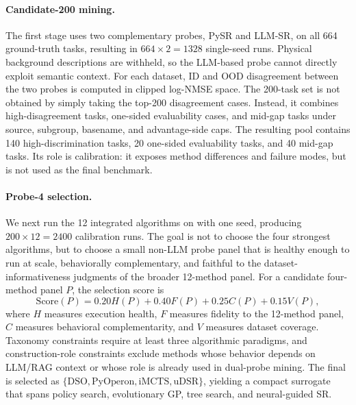 \paragraph{Candidate-200 mining.}
The first stage uses two complementary probes, PySR and LLM-SR, on all 664 ground-truth tasks, resulting in $664 \times 2 = 1328$ single-seed runs. Physical background descriptions are withheld, so the LLM-based probe cannot directly exploit semantic context. For each dataset, ID and OOD disagreement between the two probes is computed in clipped log-NMSE space. The 200-task \candidate{} set is not obtained by simply taking the top-200 disagreement cases. Instead, it combines high-disagreement tasks, one-sided evaluability cases, and mid-gap tasks under source, subgroup, basename, and advantage-side caps. The resulting pool contains 140 high-discrimination tasks, 20 one-sided evaluability tasks, and 40 mid-gap tasks. Its role is calibration: it exposes method differences and failure modes, but is not used as the final benchmark.

\paragraph{Probe-4 selection.}
We next run the 12 integrated algorithms on \candidate{} with one seed, producing $200 \times 12 = 2400$ calibration runs. The goal is not to choose the four strongest algorithms, but to choose a small non-LLM probe panel that is healthy enough to run at scale, behaviorally complementary, and faithful to the dataset-informativeness judgments of the broader 12-method panel. For a candidate four-method panel \(P\), the selection score is
\[
\mathrm{Score}(P)
=
0.20H(P)
+
0.40F(P)
+
0.25C(P)
+
0.15V(P),
\]
where \(H\) measures execution health, \(F\) measures fidelity to the 12-method panel, \(C\) measures behavioral complementarity, and \(V\) measures dataset coverage. Taxonomy constraints require at least three algorithmic paradigms, and construction-role constraints exclude methods whose behavior depends on LLM/RAG context or whose role is already used in dual-probe mining. The final \probe{} is selected as $\{\mathrm{DSO}, \mathrm{PyOperon}, \mathrm{iMCTS}, \mathrm{uDSR}\}$, yielding a compact surrogate that spans policy search, evolutionary GP, tree search, and neural-guided SR.

